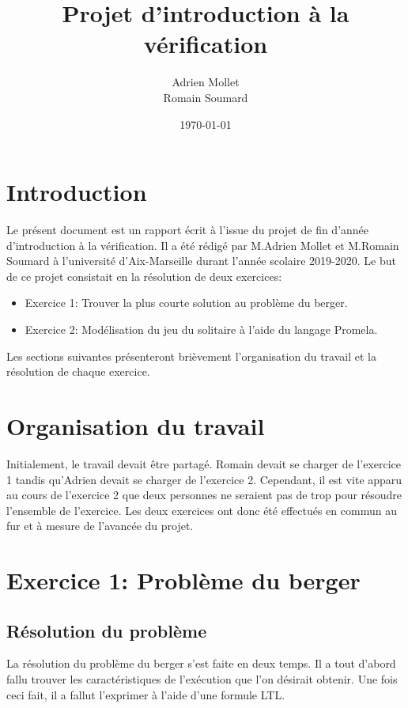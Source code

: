 \documentclass[12pt, a4paper]{report}
\title{\color{blue}Projet d'introduction à la vérification}
\date{\today}
\author{Adrien Mollet\\ Romain Soumard}
\begin{document}
\maketitle

\section{Introduction}

Le présent document est un rapport écrit à l'issue du projet de fin d'année d'introduction à la vérification. Il a été rédigé par M.Adrien Mollet et M.Romain Soumard à l'université d'Aix-Marseille durant l'année scolaire 2019-2020.
Le but de ce projet consistait en la résolution de deux exercices:
\begin{itemize}
\item Exercice 1: Trouver la plus courte solution au problème du berger.
\item Exercice 2: Modélisation du jeu du solitaire à l'aide du langage Promela.
\end{itemize}
Les sections suivantes présenteront brièvement l'organisation du travail et la résolution de chaque exercice.

\section{Organisation du travail}

Initialement, le travail devait être partagé. Romain devait se charger de l'exercice 1 tandis qu'Adrien devait se charger de l'exercice 2. Cependant, il est vite apparu au cours de l'exercice 2 que deux personnes ne seraient pas de trop pour résoudre l'ensemble de l'exercice.
Les deux exercices ont donc été effectués en commun au fur et à mesure de l'avancée du projet.

\section{Exercice 1: Problème du berger}

\subsection{Résolution du problème}

La résolution du problème du berger s'est faite en deux temps. Il a tout d'abord fallu trouver les caractéristiques de l'exécution que l'on désirait obtenir. Une fois ceci fait, il a fallut l'exprimer à l'aide d'une formule LTL.
\end{document}
